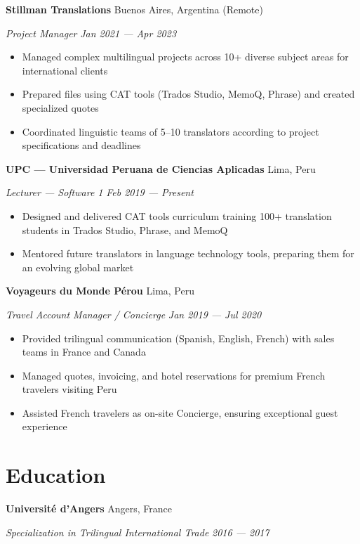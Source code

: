 \documentclass[11pt,letterpaper]{article}
\newcommand{\entry}[4]{%
  \noindent\textbf{#1} \hfill #2 \par\nopagebreak
  \textit{#3} \hfill \textit{#4} \par\nopagebreak
}
\begin{document}
\entry{Stillman Translations}{Buenos Aires, Argentina (Remote)}{Project Manager}{Jan 2021 --- Apr 2023}
\begin{itemize}
  \item Managed complex multilingual projects across 10+ diverse subject areas for international clients
  \item Prepared files using CAT tools (Trados Studio, MemoQ, Phrase) and created specialized quotes
  \item Coordinated linguistic teams of 5--10 translators according to project specifications and deadlines
\end{itemize}
\vspace{0.3em}

\entry{UPC --- Universidad Peruana de Ciencias Aplicadas}{Lima, Peru}{Lecturer --- Software 1}{Feb 2019 --- Present}
\begin{itemize}
  \item Designed and delivered CAT tools curriculum training 100+ translation students in Trados Studio, Phrase, and MemoQ
  \item Mentored future translators in language technology tools, preparing them for an evolving global market
\end{itemize}
\vspace{0.3em}

\entry{Voyageurs du Monde P\'{e}rou}{Lima, Peru}{Travel Account Manager / Concierge}{Jan 2019 --- Jul 2020}
\begin{itemize}
  \item Provided trilingual communication (Spanish, English, French) with sales teams in France and Canada
  \item Managed quotes, invoicing, and hotel reservations for premium French travelers visiting Peru
  \item Assisted French travelers as on-site Concierge, ensuring exceptional guest experience
\end{itemize}
\vspace{0.3em}

\section{Education}

\entry{Universit\'{e} d'Angers}{Angers, France}{Specialization in Trilingual International Trade}{2016 --- 2017}
\vspace{0.3em}
\end{document}
